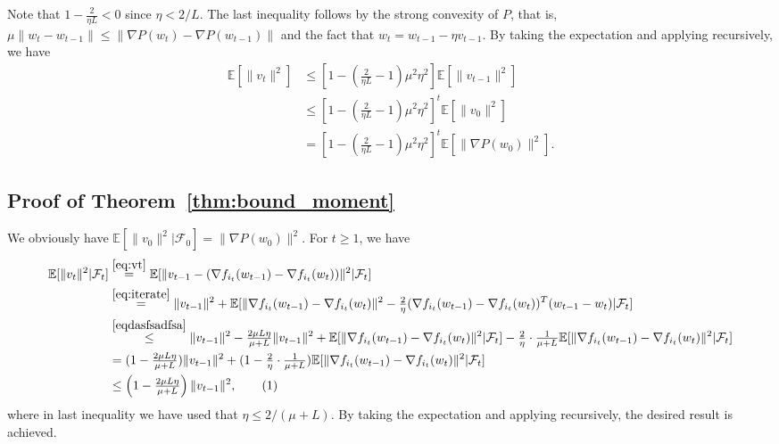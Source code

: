 \documentclass{article}
\newcommand\tagthis{\addtocounter{equation}{1}\tag{\theequation}}
\renewcommand{\top}{T}
\begin{document}
Note that $1 - \tfrac{2}{\eta L} < 0$ since $\eta < 2/L$. The last inequality follows by the strong convexity of $P$, that is, $\mu \|w_{t} - w_{t-1}\| \leq \| \nabla P(w_{t}) - \nabla P(w_{t-1})\|$ and the fact that $w_{t} = w_{t-1} - \eta v_{t-1}$. By taking the expectation and applying recursively, we have
\begin{align*}
\mathbb{E}[\| v_{t} \|^2] & \leq \left[ 1 - \left(\tfrac{2}{\eta L} - 1 \right) \mu^2 \eta^2  \right] \mathbb{E}[\| v_{t-1} \|^2] \\
& \leq \left[ 1 - \left(\tfrac{2}{\eta L} - 1 \right) \mu^2 \eta^2  \right]^{t} \mathbb{E}[\| v_{0} \|^2] \\
& = \left[ 1 - \left(\tfrac{2}{\eta L} - 1 \right) \mu^2 \eta^2  \right]^{t} \mathbb{E}[\| \nabla P(w_{0}) \|^2]. 
\end{align*}


\subsection{Proof of Theorem~\ref{thm:bound_moment}}
We obviously have $\mathbb{E}[\|v_0\|^2 | \mathcal{F}_{0}] = \|\nabla P(w_0)\|^2$. For $t \geq 1$, we have
\begin{align*}
\mathbb{E}[\| v_{t} \|^2 | \mathcal{F}_{t}] 
& \overset{\eqref{eq:vt}}{=}  \mathbb{E}[\| v_{t-1} - (\nabla f_{i_{t}}(w_{t-1}) - \nabla f_{i_{t}}(w_{t}) ) \|^2 | \mathcal{F}_{t} ] \\
&\overset{\eqref{eq:iterate}}{=} \|v_{t-1} \|^2    + \mathbb{E}[\| \nabla f_{i_{t}}(w_{t-1}) - \nabla f_{i_{t}}(w_{t}) \|^2  - \tfrac{2}{\eta}(\nabla f_{i_{t}}(w_{t-1}) - \nabla f_{i_{t}}(w_{t}))^\top (w_{t-1} - w_{t}) | \mathcal{F}_{t} ] \\
&\overset{\eqref{eqdasfsadfsa}
}{ \leq}  \|v_{t-1} \|^2  
 - \tfrac{2 \mu L \eta}{\mu + L}  \|v_{t-1} \|^2  
 + \mathbb{E}[\| \nabla f_{i_{t}}(w_{t-1}) - \nabla f_{i_{t}}(w_{t}) \|^2 | \mathcal{F}_{t} ] - \tfrac{2}{\eta} \cdot \tfrac{1}{\mu + L} \mathbb{E}[\| \nabla f_{i_{t}}(w_{t-1}) - \nabla f_{i_{t}}(w_{t}) \|^2 | \mathcal{F}_{t} ] \\
&= 
(1 - \tfrac{2 \mu L \eta}{\mu + L})  \|v_{t-1} \|^2  
+ (1- \tfrac{2}{\eta} \cdot \tfrac{1}{\mu + L} ) \mathbb{E}[\| \nabla f_{i_{t}}(w_{t-1}) - \nabla f_{i_{t}}(w_{t}) \|^2 | \mathcal{F}_{t} ] \\
& \leq  \left( 1 - \tfrac{2 \mu L \eta}{\mu + L} \right)  \|v_{t-1} \|^2,  
\tagthis \label{eqasfewafaw}
\end{align*}
where in last inequality we have used that $\eta \leq 2/(\mu+L)$. By taking the expectation and applying recursively, the desired result is achieved. 
\end{document}
